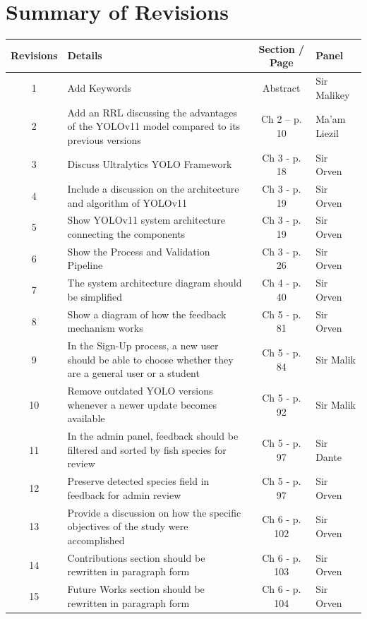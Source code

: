 \section*{Summary of Revisions}
\begin{flushleft}
\begin{tabular}{|c|p{7cm}|c|p{2.5cm}|}
    \hline
    \textbf{Revisions} & \textbf{Details} & \textbf{Section / Page} & \textbf{Panel} \\ 
    \hline
    1 & Add Keywords & Abstract & Sir Malikey \\ 
    \hline
    2 & Add an RRL discussing the advantages of the YOLOv11 model compared to its previous versions & Ch 2 – p. 10 &  Ma'am Liezil \\ 
    \hline
    3 & Discuss Ultralytics YOLO Framework & Ch 3 - p. 18 & Sir Orven \\ 
    \hline
    4 & Include a discussion on the architecture and algorithm of YOLOv11 & Ch 3 - p. 19 & Sir Orven \\ 
    \hline
    5 & Show YOLOv11 system architecture connecting the components & Ch 3 - p. 19 & Sir Orven \\ 
    \hline
    6 & Show the Process and Validation Pipeline & Ch 3 - p. 26 & Sir Orven \\ 
    \hline
    7 & The system architecture diagram should be simplified & Ch 4 - p. 40 & Sir Orven \\ 
    \hline
    8 & Show a diagram of how the feedback mechanism works & Ch 5 - p. 81 & Sir Orven \\ 
    \hline
    9 & In the Sign-Up process, a new user should be able to choose whether they are a general user or a student & Ch 5 - p. 84 & Sir Malik \\ 
    \hline
    10 & Remove outdated YOLO versions whenever a newer update becomes available & Ch 5 - p. 92 & Sir Malik \\ 
    \hline
    11 & In the admin panel, feedback should be filtered and sorted by fish species for review & Ch 5 - p. 97 & Sir Dante \\ 
    \hline
    12 & Preserve detected species field in feedback for admin review & Ch 5 - p. 97 & Sir Orven \\ 
    \hline
    13 & Provide a discussion on how the specific objectives of the study were accomplished & Ch 6 - p. 102 & Sir Orven \\ 
    \hline
    14 & Contributions section should be rewritten in paragraph form & Ch 6 - p. 103 & Sir Orven \\ 
    \hline
    15 & Future Works section should be rewritten in paragraph form & Ch 6 - p. 104 & Sir Orven \\ 
    \hline
\end{tabular}
\end{flushleft}